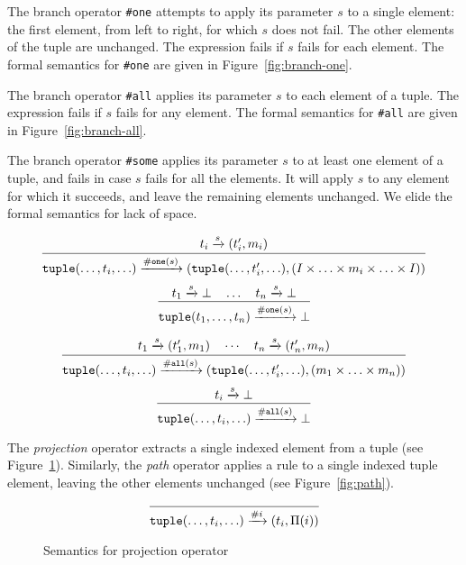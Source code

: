 The branch operator \texttt{\#one} attempts to apply its parameter
$s$ to a single element: the first element, from left to right,
for which $s$ does not fail. The other elements of the tuple are
unchanged. The expression fails if $s$ fails for each element. The
formal semantics for \texttt{\#one} are given in
Figure~\ref{fig:branch-one}.

The branch operator \texttt{\#all} applies its parameter $s$ to
each element of a tuple. The expression fails if $s$ fails for any
element. The formal semantics for \texttt{\#all} are given in
Figure~\ref{fig:branch-all}.

The branch operator \texttt{\#some} applies its parameter $s$ to
at least one element of a tuple, and fails in case $s$ fails for
all the elements. It will apply $s$ to any element for which it
succeeds, and leave the remaining elements unchanged. We elide the
formal semantics for lack of space.

\begin{figure*}[ht]
\[
\infer
  {\mathtt{tuple}(\ldots,t_i,\ldots) \arr{\mathtt{\#one}(s)} (\mathtt{tuple}(\ldots,t_i',\ldots),(I \times \ldots \times m_i \times \ldots \times I))}
  {t_i \arr{s} (t_i',m_i)}
\]
\[
\infer
  {\mathtt{tuple}(t_1,\ldots,t_n) \arr{\mathtt{\#one}(s)} \bot}
  {t_1 \arr{s} \bot \quad \ldots \quad t_n \arr{s} \bot}
\]
\caption{Semantics for branch \texttt{\#one} operator}
\label{fig:branch-one}
\end{figure*}


\begin{figure*}[ht]
\[
\infer{
  \mathtt{tuple}(\ldots,t_i,\ldots)
  \arr{\mathtt{\#all}(s)}
  (\mathtt{tuple}(\ldots,t_i',\ldots),
  (m_1 \times \ldots \times m_n))
}{
  t_1 \arr{s} (t_1',m_1) \quad \cdots \quad t_n \arr{s} (t_n',m_n)
}
\]
\[
\infer
  {\mathtt{tuple}(\ldots,t_i,\ldots) \arr{\mathtt{\#all}(s)} \bot}
  {t_i \arr{s} \bot}
\]
\caption{Semantics for branch \texttt{\#all} operator}
\label{fig:branch-all}
\end{figure*}

The \emph{projection} operator extracts a single indexed element
from a tuple (see Figure~\ref{fig:projection}). Similarly, the
\emph{path} operator applies a rule to a single indexed tuple
element, leaving the other elements unchanged (see
Figure~\ref{fig:path}).

\begin{figure}[ht]
\[
\infer
  {\mathtt{tuple}(\ldots,t_i,\ldots) \arr{\#i} (t_i,\Pi(i))}
  {}
\]
\caption{Semantics for projection operator}
\label{fig:projection}
\end{figure}

